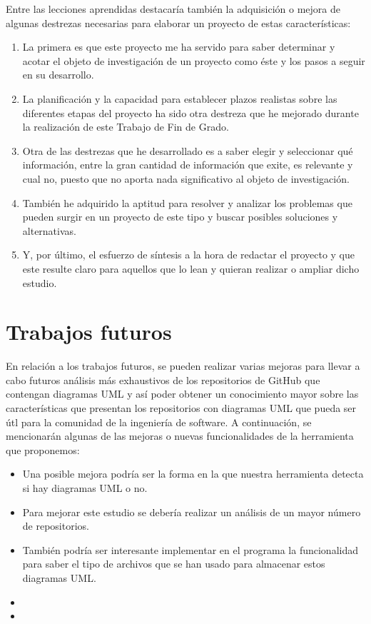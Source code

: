 \documentclass[a4paper, 12pt]{book}
\begin{document}
Entre las lecciones aprendidas destacaría también la adquisición o mejora de algunas destrezas necesarias para elaborar un proyecto de estas características:
\begin{enumerate}
  \item  La primera es que este proyecto me ha servido para saber determinar y acotar el objeto de investigación de un proyecto como éste y los pasos a seguir en su desarrollo.
  \item  La planificación y la capacidad para establecer plazos realistas sobre las diferentes etapas del proyecto ha sido otra destreza que he mejorado durante la realización de este Trabajo de Fin de Grado.
  \item  Otra de las destrezas que he desarrollado es a saber elegir y seleccionar qué información, entre la gran cantidad de información que exite, es relevante y cual no, puesto que no aporta nada significativo al objeto de investigación.
  \item  También he adquirido la aptitud para resolver y analizar los problemas que pueden surgir en un proyecto de este tipo y buscar posibles soluciones y alternativas.  
  \item  Y, por último, el esfuerzo de síntesis a la hora de redactar el proyecto y que este resulte claro para aquellos que lo lean y quieran realizar o ampliar dicho estudio. 
\end{enumerate}

\section{Trabajos futuros}
\label{sec:trabajos_futuros}


En relación a los trabajos futuros, se pueden realizar varias mejoras para llevar a cabo futuros análisis más exhaustivos de los repositorios de GitHub que contengan diagramas UML y así poder obtener un conocimiento mayor sobre las características que presentan los repositorios con diagramas UML que pueda ser útl para la comunidad de la ingeniería de software. 
A continuación, se mencionarán algunas de las mejoras o nuevas funcionalidades de la herramienta que proponemos:

\begin{itemize}
  \item  Una posible mejora podría ser la forma en la que nuestra herramienta detecta si hay diagramas UML o no.
  \item  Para mejorar este estudio se debería realizar un análisis de un mayor número de repositorios.
  \item  También podría ser interesante implementar en el programa la funcionalidad para saber el tipo de archivos que se han usado para almacenar estos diagramas UML.
  \item    
  \item 
\end{itemize}
\end{document}
